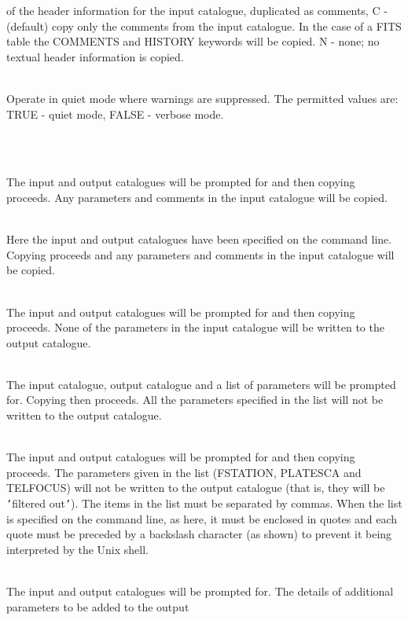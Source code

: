 \documentclass[twoside,11pt]{article}
\renewcommand{\_}{\texttt{\symbol{95}}}
\newlength{\sstexampleslength}
\newcommand{\sstexamples}[1]{
   \item[Examples:] \mbox{} \\
   \vspace{-3.5ex}
   \begin{description}
      #1
   \end{description}
}
\newcommand{\sstsubsection}[1]{ \item[{#1}] \mbox{} \\}
\newcommand{\sstexamplesubsection}[2]{\sloppy
\item[\parbox{\sstexampleslength}{\ssttt #1}] \mbox{} \vspace{1.0ex}
\\ #2 }
\newcommand{\sstexamples}[1]{
      \item[Examples:] \\
      \begin{description}
         #1
      \end{description}
      \\
   }
\newcommand{\sstsubsection}[1]{\item[{#1}]}
\newcommand{\sstexamplesubsection}[2]{\item[{\ssttt #1}] #2}
\begin{document}
\begin{htmlonly}
{{{             of the header information for the input catalogue,
             duplicated as comments,
         C - (default) copy only the comments from the input catalogue.
             In the case of a FITS table the COMMENTS and HISTORY
             keywords will be copied.
         N - none; no textual header information is copied.
      }
      \sstsubsection{
         QUIET  =  LOGICAL (read)
      }{
         Operate in quiet mode where warnings are suppressed.  The
         permitted values are:
         TRUE  - quiet mode,
         FALSE - verbose mode.
      }
   }
   \sstexamples{
      \sstexamplesubsection{
         catcopy
      }{
         The input and output catalogues will be prompted for and then
         copying proceeds.  Any parameters and comments in the input
         catalogue will be copied.
      }
      \sstexamplesubsection{
         catcopy  input-catalogue  output-catalogue
      }{
         Here the input and output catalogues have been specified on
         the command line.  Copying proceeds and any parameters and
         comments in the input catalogue will be copied.
      }
      \sstexamplesubsection{
         catcopy  copypar=none
      }{
         The input and output catalogues will be prompted for and then
         copying proceeds.  None of the parameters in the input catalogue
         will be written to the output catalogue.
      }
      \sstexamplesubsection{
         catcopy  copypar=filter
      }{
         The input catalogue, output catalogue and a list of parameters
         will be prompted for.  Copying then proceeds.  All the parameters
         specified in the list will not be written to the output catalogue.
      }
      \sstexamplesubsection{
         catcopy  copypar=filter  pfilter=$\backslash${\tt '}FSTATION,PLATESCA,TELFOCUS$\backslash${\tt '}
      }{
         The input and output catalogues will be prompted for and then
         copying proceeds.  The parameters given in the list (FSTATION,
         PLATESCA and TELFOCUS) will not be written to the output catalogue
         (that is, they will be {\tt '}filtered out{\tt '}).  The items in the list
         must be separated by commas.  When the list is specified on the
         command line, as here, it must be enclosed in quotes and each
         quote must be preceded by a backslash character (as shown) to
         prevent it being interpreted by the Unix shell.
      }
      \sstexamplesubsection{
         catcopy  addpar=true
      }{
         The input and output catalogues will be prompted for.  The
         details of additional parameters to be added to the output
}}}
\end{htmlonly}
\end{document}

